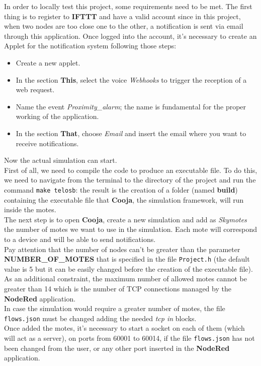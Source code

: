 In order to locally test this project, some requirements need to be met.
The first thing is to register to \textbf{IFTTT} and have a valid account since in this project, when two nodes
are too close one to the other, a notification is sent via email through this application.
Once logged into the account, it's necessary to create an Applet for the notification system following those steps:
\begin{itemize}
    \item Create a new applet.
    \item In the section \textbf{This}, select the voice \textit{Webhooks} to trigger the reception of a web request.
    \item Name the event \textit{Proximity\_alarm}; the name is fundamental for the proper working of the application.
    \item In the section \textbf{That}, choose \textit{Email} and insert the email where you want to receive notifications.
\end{itemize}
Now the actual simulation can start. \\

First of all, we need to compile the code to produce an executable file. To do this, we need to navigate from the terminal
to the directory of the project and run the command \texttt{make telosb}: the result is the creation of a folder (named 
\textbf{build}) containing the executable file that \textbf{Cooja}, the simulation framework, will run inside the motes.\\ 

The next step is to open \textbf{Cooja}, create a new simulation and add as \textit{Skymotes} the number of motes we 
want to use in the simulation. Each mote will correspond to a device and will be able to send notifications.\\ 
Pay attention that the number of nodes can't be greater than the parameter \textbf{NUMBER\_OF\_MOTES}
that is specified in the file \texttt{Project.h} (the default value is 5 but it can be easily changed before the creation of the executable file).\\ 
As an additional constraint, the maximum number of allowed motes cannot be greater than 14 which is the number of TCP connections 
managed by the \textbf{NodeRed} application.\\ 
In case the simulation would require a greater number of motes, the file \texttt{flows.json} must be changed adding the needed \textit{tcp in} blocks.\\ 
Once added the motes, it's necessary to start a socket on each of them (which will act as a server), on ports from 60001 to 
60014, if the file \texttt{flows.json} has not been changed from the user, or any other port inserted in the \textbf{NodeRed} application.\\ 

